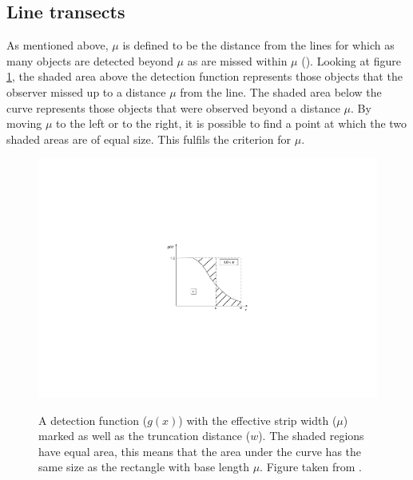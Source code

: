\subsection{Line transects} 
As mentioned above, $\mu$ is defined to be the distance from the lines for which as many objects are detected beyond $\mu$ as are missed within $\mu$ (\cite{eenviron}). Looking at figure \ref{ds-mu-explanation}, the shaded area above the detection function represents those objects that the observer missed up to a distance $\mu$ from the line. The shaded area below the curve represents those objects that were observed beyond a distance $\mu$. By moving $\mu$ to the left or to the right, it is possible to find a point at which the two shaded areas are of equal size. This fulfils the criterion for $\mu$.

\begin{figure}
\centering
\includegraphics{intro/figs/muexplanation.pdf}\\
\caption{A detection function ($g(x)$) with the effective strip width ($\mu$) marked as well as the truncation distance ($w$). The shaded regions have equal area, this means that the area under the curve has the same size as the rectangle with base length $\mu$. Figure taken from \cite{IDS}.}
\label{ds-mu-explanation}
\end{figure}

